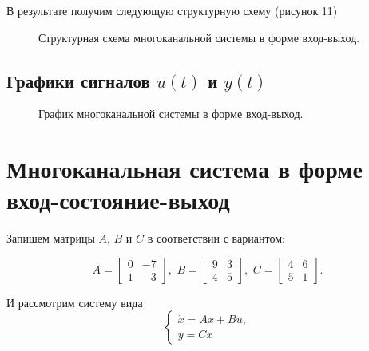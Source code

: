 \documentclass[a5paper, 10pt]{article}
\theoremstyle{definition}
\theoremstyle{plain}
\theoremstyle{remark}
\begin{document}
В результате получим следующую структурную схему (рисунок 11)

\begin{figure}[h]
\caption{Структурная схема многоканальной системы в форме вход-выход.}
\end{figure}



\newpage
\subsection{Графики сигналов $u(t)$ и $y(t)$}

\begin{figure}[h]
\caption{График многоканальной системы в форме вход-выход.}
\end{figure}

\newpage
\section{Многоканальная система в форме вход-состояние-выход}
Запишем матрицы $A$, $B$ и $C$ в соответствии с вариантом:

\begin{equation*}
A = 
\begin{bmatrix}
0 & -7\\
1 & -3
\end{bmatrix},\,\,
B = 
\begin{bmatrix}
9 & 3\\
4 & 5
\end{bmatrix}, \,\,
C = 
\begin{bmatrix}
4 & 6\\
5 & 1
\end{bmatrix}.
\end{equation*}

И рассмотрим систему вида
\begin{equation*}
\begin{cases}
\dot{x} = Ax + Bu,\\
y = Cx
\end{cases}
\end{equation*}
\end{document}
